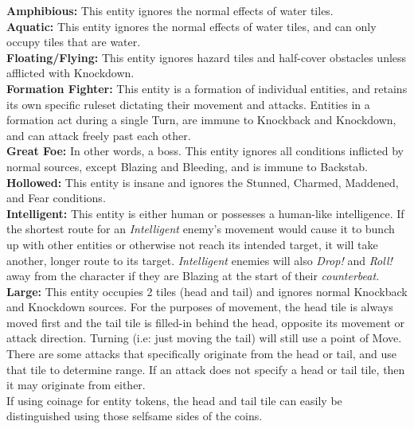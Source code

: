 \documentclass[12pt]{article}
\begin{document}
\begin{multicols*}{2}
\textbf{Amphibious:} This entity ignores the normal effects of water tiles.\\

\textbf{Aquatic:} This entity ignores the normal effects of water tiles, and can only occupy tiles that are water.\\

\textbf{Floating/Flying:} This entity ignores hazard tiles and half-cover obstacles unless afflicted with Knockdown.\\

\textbf{Formation Fighter:} This entity is a formation of individual entities, and retains its own specific ruleset dictating their movement and attacks. Entities in a formation act during a single Turn, are immune to Knockback and Knockdown, and can attack freely past each other.\\

\textbf{Great Foe:} In other words, a boss. This entity ignores all conditions inflicted by normal sources, except Blazing and Bleeding, and is immune to Backstab.\\

\textbf{Hollowed:} This entity is insane and ignores the Stunned, Charmed, Maddened, and Fear conditions.\\

\textbf{Intelligent:} This entity is either human or possesses a human-like intelligence. If the shortest route for an \emph{Intelligent} enemy’s movement would cause it to bunch up with other entities or otherwise not reach its intended target, it will take another, longer route to its target. \emph{Intelligent} enemies will also \emph{Drop!} and \emph{Roll!} away from the character if they are Blazing at the start of their \emph{counterbeat.}\\

\textbf{Large:} This entity occupies 2 tiles (head and tail) and ignores normal Knockback and Knockdown sources. For the purposes of movement, the head tile is always moved first and the tail tile is filled-in behind the head, opposite its movement or attack direction. Turning (i.e: just moving the tail) will still use a point of Move.\\
There are some attacks that specifically originate from the head or tail, and use that tile to determine range. If an attack does not specify a head or tail tile, then it may originate from either.\\
If using coinage for entity tokens, the head and tail tile can easily be distinguished using those selfsame sides of the coins.\\


\end{multicols*}
\end{document}
